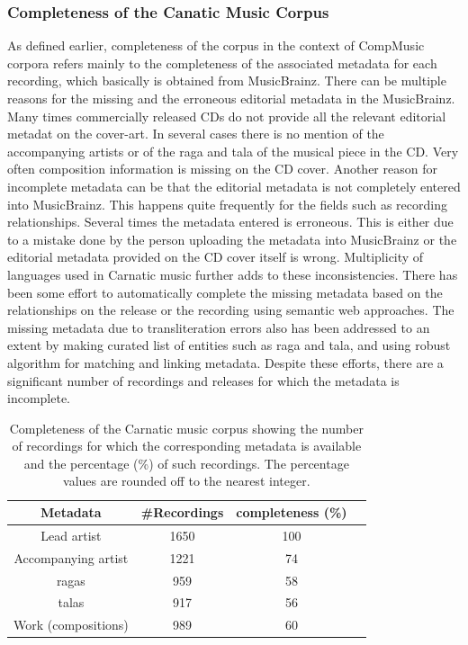 \subsubsection{Completeness of the Canatic Music Corpus}
\label{sec:corpus_completeness_of_completeness_of_carnatic_music_corpus}


As defined earlier, completeness of the corpus in the context of CompMusic corpora refers mainly to the completeness of the associated metadata
for each recording, which basically is obtained from MusicBrainz. There can be multiple reasons for the missing and the erroneous editorial metadata in the MusicBrainz. Many times commercially released CDs do not provide all the relevant editorial metadat on the cover-art. In several cases there is no mention of the accompanying artists or of the \gls{raga} and \gls{tala} of the musical piece in the CD. Very often composition information is missing on the CD cover. Another reason for incomplete metadata can be that the editorial metadata is not completely entered into MusicBrainz. This happens quite frequently for the fields such as recording relationships. Several times the metadata entered is erroneous. This is either due to a mistake done by the person uploading the metadata into MusicBrainz or the editorial metadata provided on the CD cover itself is wrong. Multiplicity of languages used in Carnatic music further adds to these inconsistencies. There has been some effort to automatically complete the missing metadata based on the relationships on the release or the recording using semantic web approaches. The missing metadata due to transliteration errors also has been addressed to an extent by making curated list of entities such as \gls{raga} and \gls{tala}, and using robust algorithm for matching and linking metadata. Despite these efforts, there are a significant number of recordings and releases for which the metadata is incomplete.


\begin{table}
	\begin{centering}
		\begin{tabular}{ c c c c}
			\hline
			Metadata	 		&  \#Recordings	& completeness (\%)\\
			\hline
			Lead artist			& 	1650	& 	100	\\						
			Accompanying artist	& 	1221	& 	74	\\
			\Glspl{raga}		& 	959		& 	58	\\
			\Glspl{tala}		& 	917		& 	56	\\
			Work (compositions)		& 	989		& 	60	\\
			
			\hline
			
		\end{tabular}
		\par \end{centering}	
	\caption[Completeness of the Carnatic music corpus]{Completeness of the Carnatic music corpus showing the number of recordings for which the corresponding metadata is available and the percentage (\%) of such recordings. The percentage values are rounded off to the nearest integer.} 
	\label{tab:completeness_carnatic_corpus}
\end{table}


